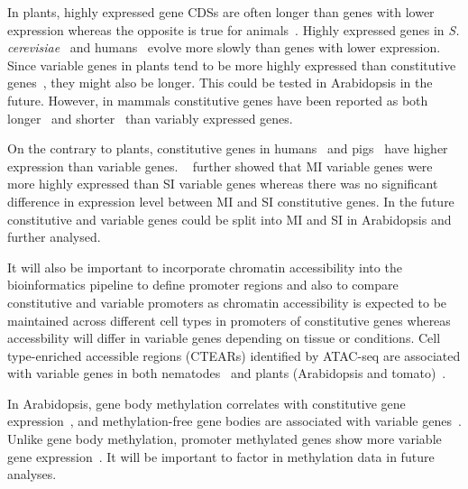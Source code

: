 In plants, highly expressed gene CDSs are often longer than genes with lower expression whereas the opposite is true for animals~\autocite{renPlantsHighlyExpressed2006}.
Highly expressed genes in \textit{S. cerevisiae}~\autocite{drummondWhyHighlyExpressed2005} and humans~\autocite{berthelotComplexityConservationRegulatory2018} evolve more slowly than genes with lower expression.
Since variable genes in plants tend to be more highly expressed than constitutive genes~\autocite{czechowskiGenomeWideIdentificationTesting2005, mortonPairedEndAnalysisTranscription2014}, they might also be longer.
This could be tested in Arabidopsis in the future.
However, in mammals constitutive genes have been reported as both longer~\autocite{zhuNatureHumanHousekeeping2008} and shorter~\autocite{eisenbergHumanHousekeepingGenes2003,weiCharacterizationGenePromoters2019} than variably expressed genes.

On the contrary to plants, constitutive genes in humans~\autocite{zhuNatureHumanHousekeeping2008,mattioliHighthroughputFunctionalAnalysis2019} and pigs~\autocite{weiCharacterizationGenePromoters2019} have higher expression than variable genes. 
~\textcite*{biswasEvolutionaryRateHeterogeneity2018} further showed that MI variable genes were more highly expressed than SI variable genes whereas there was no significant difference in expression level between MI and SI constitutive genes. In the future constitutive and variable genes could be split into MI and SI in Arabidopsis and further analysed.

It will also be important to incorporate chromatin accessibility into the bioinformatics pipeline to define promoter regions and also to compare constitutive and variable promoters as chromatin accessibility is expected to be maintained across different cell types in promoters of constitutive genes whereas accessbility will differ in variable genes depending on tissue or conditions.
Cell type\hyp{}enriched accessible regions (CTEARs) identified by ATAC-seq are associated with variable genes in both nematodes~\autocite{daughertyChromatinAccessibilityDynamics2017} and plants (Arabidopsis and tomato)~\autocite{kajalaInnovationConservationRepurposing2020b}.

In Arabidopsis, gene body methylation correlates with constitutive gene expression~\autocite{zhangGenomewideHighResolutionMapping2006, takunoBodyMethylatedGenesArabidopsis2012}, and methylation\hyp{}free gene bodies are associated with variable genes~\autocite{aceitunoRulesGeneExpression2008}. Unlike gene body methylation, promoter methylated genes show more variable gene expression~\autocite{zhangGenomewideHighResolutionMapping2006}. It will be important to factor in methylation data in future analyses.

